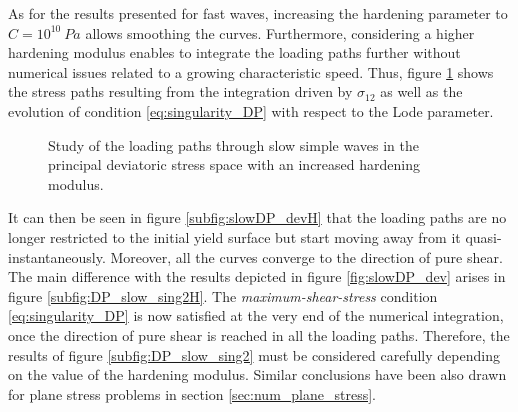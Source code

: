 As for the results presented for fast waves, increasing the hardening parameter to $C=10^{10} \: Pa$ allows smoothing the curves.
Furthermore, considering a higher hardening modulus enables to integrate the loading paths further without numerical issues related to a growing characteristic speed.
Thus, figure \ref{fig:slowDP_devH} shows the stress paths resulting from the integration driven by $\sigma_{12}$ as well as the evolution of condition \eqref{eq:singularity_DP} with respect to the Lode parameter.
\begin{figure}[h!]
  \centering
  \caption{Study of the loading paths through slow simple waves in the principal deviatoric stress space with an increased hardening modulus.}
  \label{fig:slowDP_devH}
\end{figure}
It can then be seen in figure \ref{subfig:slowDP_devH} that the loading paths are no longer restricted to the initial yield surface but start moving away from it quasi-instantaneously.
Moreover, all the curves converge to the direction of pure shear.
The main difference with the results depicted in figure \ref{fig:slowDP_dev} arises in figure \ref{subfig:DP_slow_sing2H}.
The \textit{maximum-shear-stress} condition \eqref{eq:singularity_DP} is now satisfied at the very end of the numerical integration, once the direction of pure shear is reached in all the loading paths.
Therefore, the results of figure \ref{subfig:DP_slow_sing2} must be considered carefully depending on the value of the hardening modulus.
Similar conclusions have been also drawn for plane stress problems in section \ref{sec:num_plane_stress}.

